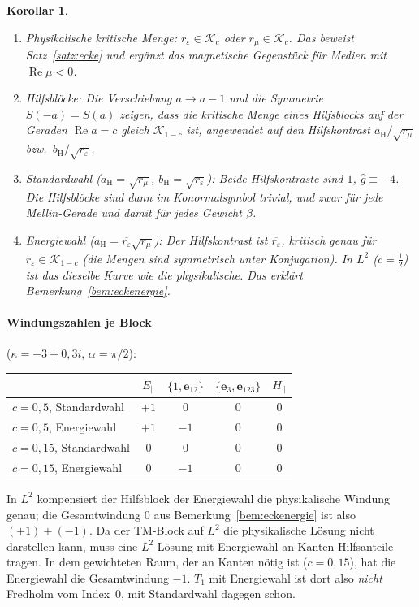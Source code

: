 \documentclass[11pt, a4paper]{article}
\newcommand{\mvec}[1]{\boldsymbol{#1}}
\theoremstyle{plain}
\newtheorem{korollar}[satz]{Korollar}
\theoremstyle{definition}
\begin{document}
\begin{korollar}\label{kor:faktor}
\begin{enumerate}[leftmargin=*]
  \item \emph{Physikalische kritische Menge:} $r_\varepsilon\in\mathcal{K}_c$
    oder $r_\mu\in\mathcal{K}_c$. Das beweist Satz~\ref{satz:ecke} und ergänzt das magnetische Gegenstück für Medien mit
    $\operatorname{Re}\mu<0$.
  \item \emph{Hilfsblöcke:} Die Verschiebung $a\to a-1$ und die Symmetrie
    $S(-a)=S(a)$ zeigen, dass die kritische Menge eines Hilfsblocks auf der Geraden
    $\operatorname{Re}a=c$ gleich $\mathcal{K}_{1-c}$ ist, angewendet auf den
    Hilfskontrast $a_{\mathrm H}/\sqrt{r_\mu}$ bzw.\ $b_{\mathrm H}/\sqrt{r_\varepsilon}$.
  \item \emph{Standardwahl} ($a_{\mathrm H}=\sqrt{r_\mu}$,
    $b_{\mathrm H}=\sqrt{r_\varepsilon}$): Beide Hilfskontraste sind $1$,
    $\hat g\equiv-4$. Die Hilfsblöcke sind dann im Konormalsymbol \emph{trivial}, und
    zwar für jede Mellin-Gerade und damit für jedes Gewicht $\beta$.
  \item \emph{Energiewahl} ($a_{\mathrm H}=\overline{r_\varepsilon}\sqrt{r_\mu}$):
    Der Hilfskontrast ist $\overline{r_\varepsilon}$, kritisch genau für
    $r_\varepsilon\in\mathcal{K}_{1-c}$ (die Mengen sind symmetrisch unter
    Konjugation). In $L^2$ ($c=\tfrac12$) ist das dieselbe Kurve wie die
    physikalische. Das erklärt Bemerkung~\ref{bem:eckenergie}.
\end{enumerate}
\end{korollar}

\paragraph{Windungszahlen je Block} ($\kappa=-3+0{,}3i$, $\alpha=\pi/2$):
\begin{center}\small
\begin{tabular}{lcccc}
\toprule
& $E_\parallel$ & $\{1,\mvec{e}_{12}\}$ & $\{\mvec{e}_3,\mvec{e}_{123}\}$ & $H_\parallel$\\
\midrule
$c=0{,}5$, Standardwahl & $+1$ & 0 & 0 & 0\\
$c=0{,}5$, Energiewahl & $+1$ & $-1$ & 0 & 0\\
$c=0{,}15$, Standardwahl & 0 & 0 & 0 & 0\\
$c=0{,}15$, Energiewahl & 0 & $-1$ & 0 & 0\\
\bottomrule
\end{tabular}
\end{center}
In $L^2$ kompensiert der Hilfsblock der Energiewahl die physikalische Windung
genau; die Gesamtwindung $0$ aus Bemerkung~\ref{bem:eckenergie} ist also $(+1)+(-1)$.
Da der TM-Block auf $L^2$ die physikalische Lösung nicht darstellen kann, muss eine
$L^2$-Lösung mit Energiewahl an Kanten Hilfsanteile tragen. In dem gewichteten Raum,
der an Kanten nötig ist ($c=0{,}15$), hat die Energiewahl die Gesamtwindung $-1$.
$T_1$ mit Energiewahl ist dort also \emph{nicht} Fredholm vom Index~0, mit
Standardwahl dagegen schon.
\end{document}
